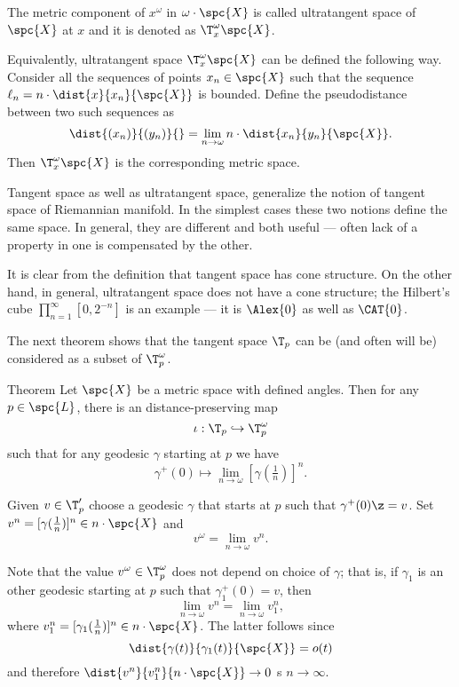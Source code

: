 The metric component of $x^\omega$ in $\omega\cdot\spc{X}$ is called ultratangent space of $\spc{X}$ at $x$ and it is denoted as $\T^\omega_x\spc{X}$.

Equivalently, ultratangent space $\T^\omega_x\spc{X}$ can be defined the following way.
Consider all the sequences of points $x_n\in \spc{X}$ such that
the sequence $\ell_n=n\cdot\dist{x}{x_n}{\spc{X}}$ is bounded.
Define the pseudodistance between two such sequences as 
\[\dist{(x_n)}{(y_n)}{}
=
\lim_{n\to\omega}n\cdot\dist{x_n}{y_n}{\spc{X}}.\]
Then $\T^\omega_x\spc{X}$ is the corresponding metric space.

Tangent space as well as ultratangent space, 
generalize the notion of tangent space of Riemannian manifold.
In the simplest cases these two notions define the same space.
In general, they are different and both useful ---
often lack of a property in one is compensated by the other.

It is clear from the definition that tangent space has cone structure.
On the other hand, in general, ultratangent space does not have a cone structure; 
the Hilbert's cube $\prod_{n=1}^\infty[0,2^{-n}]$ is an example --- it is $\Alex{0}$ as well as $\CAT{0}$.

The next theorem shows that the tangent space $\T_p$ can be (and often will be) considered as a subset of  $\T^\omega_p$.

\begin{thm}{Theorem}\label{thm:tangent-ultratangent}
\label{thm:T-in-T^w} 
Let $\spc{X}$ be a metric space with defined angles.
Then for any $p\in \spc{L}$, there is an distance-preserving map 
\[\iota:\T_p\hookrightarrow \T^\omega_p\] 
such that for any geodesic $\gamma$ starting at $p$
we have 
\[\gamma^+(0)\mapsto \lim_{n\to\omega}[\gamma(\tfrac1n)]^n.\]

\end{thm}

Given $v\in \T'_p$ 
choose a geodesic $\gamma$ that starts at $p$ such that $\gamma^+(0)\z=v$.
Set $v^n=[\gamma(\tfrac1n)]^n\in n\cdot \spc{X}$ and 
\[v^\omega=\lim_{n\to\omega}v^n.\]

Note that the value $v^\omega\in\T^\omega_p$ does not depend on choice of $\gamma$;
that is, if $\gamma_1$ is an other geodesic starting at $p$ such that $\gamma_1^+(0)=v$,
then 
\[\lim_{n\to\omega}v^n=\lim_{n\to\omega}v_1^n,\]
where $v_1^n=[\gamma_1(\tfrac1n)]^n\in n\cdot \spc{X}$.
The latter follows since
\[\dist{\gamma(t)}{\gamma_1(t)}{\spc{X}}=o(t)\]
and therefore $\dist{v^n}{v_1^n}{n\cdot \spc{X}}\to 0$ s $n\to\infty$.



